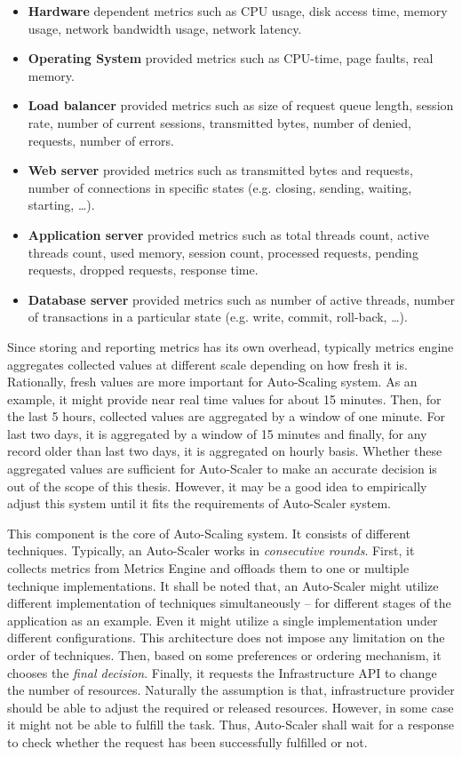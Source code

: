 \begin{description}[leftmargin=0pt]
    \begin{itemize}
        \item \textbf{Hardware} dependent metrics such as CPU usage, disk access time, memory usage, network bandwidth usage, network latency.
        \item \textbf{Operating System} provided metrics such as CPU-time, page faults, real memory.
        \item \textbf{Load balancer} provided metrics such as size of request queue length, session rate, number of current sessions, transmitted bytes, number of denied, requests, number of errors.
        \item \textbf{Web server} provided metrics such as transmitted bytes and requests, number of connections in specific states (e.g. closing, sending, waiting, starting, \dots).
        \item \textbf{Application server} provided metrics such as total threads count, active threads count, used memory, session count, processed requests, pending requests, dropped requests, response time.
        \item \textbf{Database server} provided metrics such as number of active threads, number of transactions in a particular state (e.g. write, commit, roll-back, \dots).
    \end{itemize}
    Since storing and reporting metrics has its own overhead, typically metrics engine aggregates collected values at different scale depending on how fresh it is. Rationally, fresh values are more important for Auto-Scaling system. As an example, it might provide near real time values for about 15 minutes. Then, for the last 5 hours, collected values are aggregated by a window of one minute. For last two days, it is aggregated by a window of 15 minutes and finally, for any record older than last two days, it is aggregated on hourly basis. Whether these aggregated values are sufficient for Auto-Scaler to make an accurate decision is out of the scope of this thesis. However, it may be a good idea to empirically adjust this system until it fits the requirements of Auto-Scaler system.
    \item[Auto-Scaler] This component is the core of Auto-Scaling system. It consists of different techniques. Typically, an Auto-Scaler works in \emph{consecutive rounds}. First, it collects metrics from Metrics Engine and offloads them to one or multiple technique implementations. It shall be noted that, an Auto-Scaler might utilize different implementation of techniques simultaneously -- for different stages of the application as an example. Even it might utilize a single implementation under different configurations. This architecture does not impose any limitation on the order of techniques. Then, based on some preferences or ordering mechanism, it chooses the \emph{final decision}. Finally, it requests the Infrastructure API to change the number of resources. Naturally the assumption is that, infrastructure provider should be able to adjust the required or released resources. However, in some case it might not be able to fulfill the task. Thus, Auto-Scaler shall wait for a response to check whether the request has been successfully fulfilled or not. 
\end{description}
